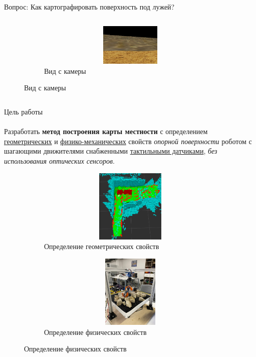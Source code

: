 \documentclass[aspectratio=169,xcolor=table,10pt]{beamer}
\begin{document}
\begin{frame}[t]{Вопрос: Как картографировать поверхность под лужей?}
\begin{columns}[T,onlytextwidth]
\begin{column}{0.44\textwidth}
\begin{figure}[H]
                \begin{subfigure}{0.8\textwidth}
                    \centering\includegraphics[height=2cm,width=1\textwidth,keepaspectratio]{terrain_w_water_camera.png}
                    \caption*{Вид с камеры}
                \end{subfigure}
            \end{figure}
        \end{column}
    \end{columns}
\end{frame}

\begin{frame}[t]{Цель работы}
    \framesubtitle{}
    Разработать \textbf{метод построения карты местности} с определением \underline{геометрических} и \underline{физико-механических} свойств \textit{опорной поверхности} роботом с шагающими движителями снабженными \underline{тактильными датчиками}, \textit{без использования оптических сенсоров}.
    \begin{figure}[H]
        \begin{subfigure}{0.49\textwidth}
            \centering\includegraphics[height=3.5cm,width=1\textwidth,keepaspectratio]{conv_concave.png}
            \caption*{Определение геометрических свойств}
        \end{subfigure}
        \begin{subfigure}{0.49\textwidth}
            \centering\includegraphics[height=3.5cm,width=1\textwidth,keepaspectratio]{s_shape_leg/view.jpg}
            \caption*{Определение физических свойств}
            \label{fig:s_shape_leg/view.jpg}
        \end{subfigure}
    \end{figure}
\end{frame}
\end{document}
